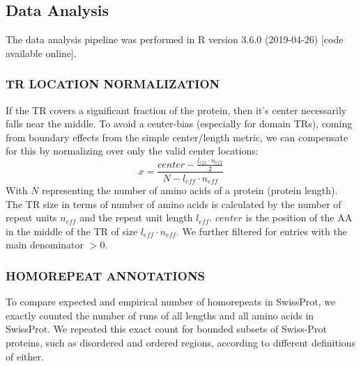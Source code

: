 \documentclass[a4,center,fleqn]{NAR}
\begin{document}
%
%

\subsection{Data Analysis}
The data analysis pipeline was performed in R version 3.6.0 (2019-04-26) \cite{R} [code available online].

\subsubsection{\MakeUppercase{TR location normalization}}
If the TR covers a significant fraction of the protein, then it's center necessarily falls near the middle. To avoid a center-bias (especially for domain TRs), coming from boundary effects from the simple center/length metric, we can compensate for this by normalizing over only the valid center locations:
\begin{equation}
x = \frac{center - \frac{l_{eff} \cdot n_{eff}}{2}}{N-l_{eff} \cdot n_{eff}}
\end{equation}
With $N$ representing the number of amino acids of a protein (protein length). The TR size in terms of number of amino acids is calculated by the number of repeat units $n_{eff}$ and the repeat unit length $l_{eff}$. $center$ is the position of the AA in the middle of the TR of size $l_{eff} \cdot n_{eff}$. We further filtered for entries with the main denominator $>0$.

\subsubsection{\MakeUppercase{Homorepeat annotations}}
To  compare expected and empirical number of homorepeats in SwissProt, we exactly counted the number of runs of all lengths and all amino acids in SwissProt. We repeated this exact count for bounded subsets of Swiss-Prot proteins, such as disordered and ordered regions, according to different definitions of either.
\end{document}
